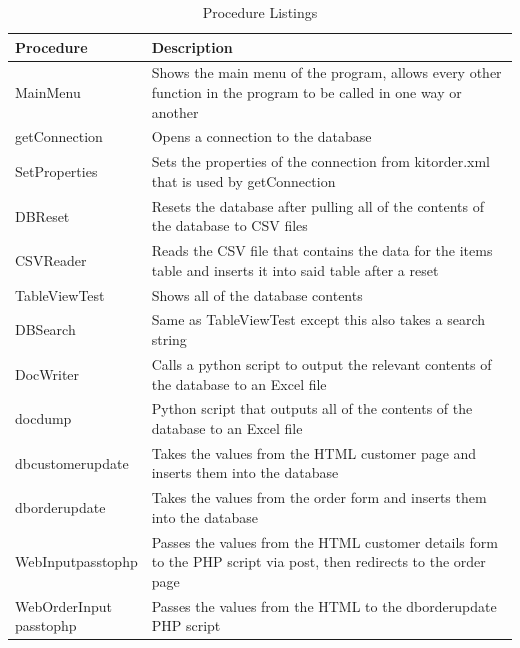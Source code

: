 \documentclass[11pt]{report}
\begin{document}
		\begin{longtable}{|p{0.2\linewidth}|p{0.8\linewidth}|}
			\caption{Procedure Listings}\\
			\hline 
			Procedure & Description\\[0.5ex]
			\hline
			\endhead
			\hline
			\endfoot
			MainMenu & Shows the main menu of the program, allows every other function in the program to be called in one way or another \\
			getConnection & Opens a connection to the database\\
			SetProperties & Sets the properties of the connection from kitorder.xml that is used by getConnection\\
			DBReset & Resets the database after pulling all of the contents of the database to CSV files\\
			CSVReader & Reads the CSV file that contains the data for the items table and inserts it into said table after a reset \\
			TableViewTest & Shows all of the database contents \\
			DBSearch & Same as TableViewTest except this also takes a search string \\
			DocWriter & Calls a python script to output the relevant contents of the database to an Excel file \\
			docdump & Python script that outputs all of the contents of the database to an Excel file \\
			dbcustomerupdate & Takes the values from the HTML customer page and inserts them into the database \\
			dborderupdate & Takes the values from the order form and inserts them into the database \\
			WebInputpasstophp & Passes the values from the HTML customer details form to the PHP script via post, then redirects to the order page \\
			WebOrderInput passtophp & Passes the values from the HTML to the dborderupdate PHP script\\
		\end{longtable}	
\end{document}
